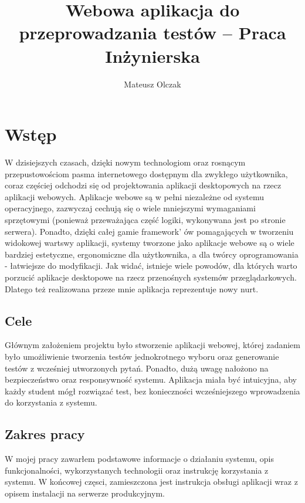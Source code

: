 \documentclass[a4paper, titlepage]{article}
\begin{document}
	\author{Mateusz Olczak}

	\title{Webowa aplikacja do przeprowadzania testów -- Praca Inżynierska}

	\maketitle
	\newpage


	\section{\textbf{Wstęp}}

	W dzisiejszych czasach, dzięki nowym technologiom oraz rosnącym przepustowościom pasma internetowego dostępnym dla zwykłego użytkownika, coraz częściej odchodzi się od projektowania aplikacji desktopowych na rzecz aplikacji webowych. Aplikacje webowe są w pełni niezależne od systemu operacyjnego, zazwyczaj cechują się o wiele mniejszymi wymaganiami sprzętowymi (ponieważ przeważająca część logiki, wykonywana jest po stronie serwera). Ponadto, dzięki całej gamie framework' ów pomagających w tworzeniu widokowej wartswy aplikacji, systemy tworzone jako aplikacje webowe są o wiele bardziej estetyczne, ergonomiczne dla użytkownika, a dla twórcy oprogramowania - łatwiejsze do modyfikacji. 
	Jak widać, istnieje wiele powodów, dla których warto porzucić aplikacje desktopowe na rzecz przenośnych systemów przeglądarkowych. Dlatego też realizowana przeze mnie aplikacja reprezentuje nowy nurt.

	\subsection{Cele}
	Głównym założeniem projektu było stworzenie aplikacji webowej, której zadaniem było umożliwienie tworzenia testów jednokrotnego wyboru oraz generowanie testów z wcześniej utworzonych pytań.
	Ponadto, dużą uwagę nałożono na bezpieczeństwo oraz responsywność systemu. Aplikacja miała być intuicyjna, aby każdy student mógł rozwiązać test, bez konieczności wcześniejszego wprowadzenia do korzystania z systemu. 
	\subsection{Zakres pracy}
	W mojej pracy zawarłem podstawowe informacje o działaniu systemu, opis funkcjonalności, wykorzystanych technologii oraz instrukcję korzystania z systemu. W końcowej częsci, zamieszczona jest instrukcja obsługi aplikacji wraz z opisem instalacji na serwerze produkcyjnym.
\end{document}
